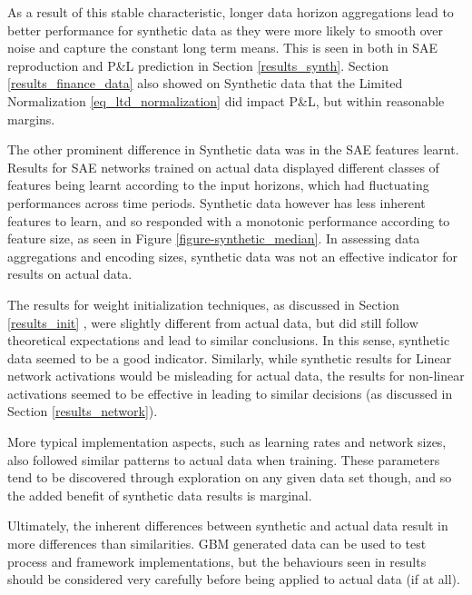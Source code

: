 \documentclass[a4paper,11pt,oneside]{article}
\theoremstyle{plain}
\theoremstyle{definition}
\begin{document}
		As a result of this stable characteristic, longer data horizon aggregations lead to better performance for synthetic data as they were more likely to smooth over noise and capture the constant long term means. This is seen in both in SAE reproduction and P\&L prediction in Section \ref{results_synth}. Section \ref{results_finance_data} also showed on Synthetic data that the Limited Normalization \eqref{eq_ltd_normalization} did impact P\&L, but within reasonable margins.\newline
	
		The other prominent difference in Synthetic data was in the SAE features learnt. Results for SAE networks trained on actual data displayed different classes of features being learnt according to the input horizons, which had fluctuating performances across time periods. Synthetic data however has less inherent features to learn, and so responded with a monotonic performance according to feature size, as seen in Figure \ref{figure-synthetic_median}. In assessing data aggregations and encoding sizes, synthetic data was not an effective indicator for results on actual data. \newline
	
		The results for weight initialization techniques, as discussed in Section \ref{results_init} , were slightly different from actual data, but did still follow theoretical expectations and lead to similar conclusions. In this sense, synthetic data seemed to be a good indicator. Similarly, while synthetic results for Linear network activations would be misleading for actual data, the results for non-linear activations seemed to be effective in leading to similar decisions (as discussed in Section \ref{results_network}).\newline
		
		More typical implementation aspects, such as learning rates and network sizes, also followed similar patterns to actual data when training. These parameters tend to be discovered through exploration on any given data set though, and so the added benefit of synthetic data results is marginal.\newline
		
		Ultimately, the inherent differences between synthetic and actual data result in more differences than similarities. GBM generated data can be used to test process and framework implementations, but the behaviours seen in results should be considered very carefully before being applied to actual data (if at all).
	
\end{document}
